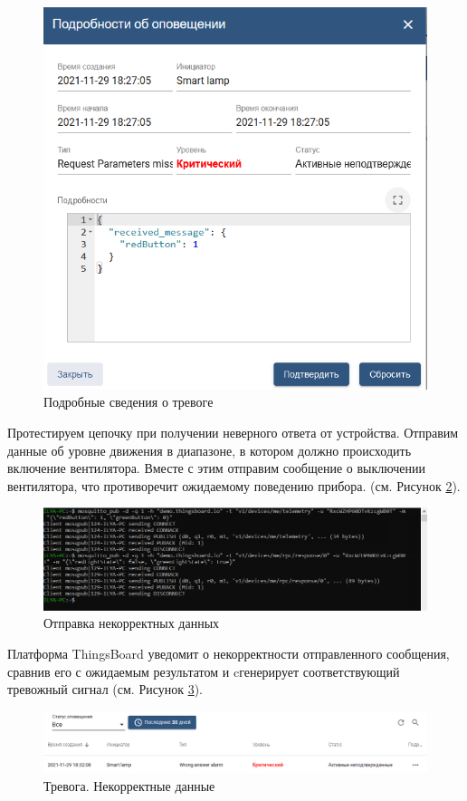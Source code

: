 \documentclass[a4paper,14pt]{extarticle}
\begin{document}
\begin{figure}[h!]
	\centering
	\includegraphics[width=0.7\linewidth]{images/t2-alarm-missing-params-detail}
	\caption{Подробные сведения о тревоге}
	\label{fig:t2-alarm-missing-params-detail}
\end{figure}

Протестируем цепочку при получении неверного ответа от устройства. Отправим данные об уровне движения в диапазоне, в котором должно происходить включение вентилятора. Вместе с этим отправим сообщение о выключении вентилятора, что противоречит ожидаемому поведению прибора. (см. Рисунок \ref{fig:t2-send-p2}).

\begin{figure}[h!]
	\centering
	\includegraphics[width=1\linewidth]{images/t2-send-p2}
	\caption{Отправка некорректных данных}
	\label{fig:t2-send-p2}
\end{figure}

Платформа ThingsBoard уведомит о некорректности отправленного сообщения, сравнив его с ожидаемым результатом и cгенерирует соответствующий тревожный сигнал (см. Рисунок \ref{fig:t2-alarm-wrong-response}).

\begin{figure}[h!]
	\centering
	\includegraphics[width=1\linewidth]{images/t2-alarm-wrong-response}
	\caption{Тревога. Некорректные данные}
	\label{fig:t2-alarm-wrong-response}
\end{figure}
\end{document}
